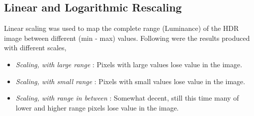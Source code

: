 \documentclass{article}
\begin{document}
    \subsection*{Linear and Logarithmic Rescaling}
    Linear scaling was used to map the complete range (Luminance) of the HDR image between different (min - max) values. Following were the results produced with different scales,
    \begin{itemize}
        \item \textit{Scaling, with large range} : Pixels with large values lose value in the image.
        \item \textit{Scaling, with small range} : Pixels with small values lose value in the image.
        \item \textit{Scaling, with range in between} : Somewhat decent, still this time many of lower and higher range pixels lose value in the image.
    \end{itemize}
\end{document}
